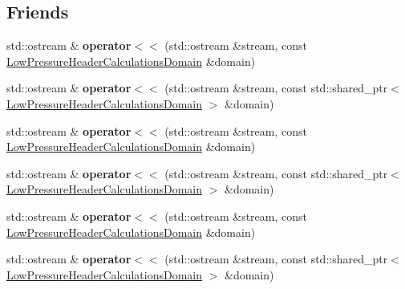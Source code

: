 \subsection*{Friends}
\begin{DoxyCompactItemize}
\item 
\mbox{\label{class_low_pressure_header_calculations_domain_a591fa325c475690e838e1e50762635d5}} 
std\+::ostream \& {\bfseries operator$<$$<$} (std\+::ostream \&stream, const \hyperlink{class_low_pressure_header_calculations_domain}{Low\+Pressure\+Header\+Calculations\+Domain} \&domain)
\item 
\mbox{\label{class_low_pressure_header_calculations_domain_a3bad233c04c027aef6be3a3e3cdc4158}} 
std\+::ostream \& {\bfseries operator$<$$<$} (std\+::ostream \&stream, const std\+::shared\+\_\+ptr$<$ \hyperlink{class_low_pressure_header_calculations_domain}{Low\+Pressure\+Header\+Calculations\+Domain} $>$ \&domain)
\item 
\mbox{\label{class_low_pressure_header_calculations_domain_a591fa325c475690e838e1e50762635d5}} 
std\+::ostream \& {\bfseries operator$<$$<$} (std\+::ostream \&stream, const \hyperlink{class_low_pressure_header_calculations_domain}{Low\+Pressure\+Header\+Calculations\+Domain} \&domain)
\item 
\mbox{\label{class_low_pressure_header_calculations_domain_a3bad233c04c027aef6be3a3e3cdc4158}} 
std\+::ostream \& {\bfseries operator$<$$<$} (std\+::ostream \&stream, const std\+::shared\+\_\+ptr$<$ \hyperlink{class_low_pressure_header_calculations_domain}{Low\+Pressure\+Header\+Calculations\+Domain} $>$ \&domain)
\item 
\mbox{\label{class_low_pressure_header_calculations_domain_a591fa325c475690e838e1e50762635d5}} 
std\+::ostream \& {\bfseries operator$<$$<$} (std\+::ostream \&stream, const \hyperlink{class_low_pressure_header_calculations_domain}{Low\+Pressure\+Header\+Calculations\+Domain} \&domain)
\item 
\mbox{\label{class_low_pressure_header_calculations_domain_a3bad233c04c027aef6be3a3e3cdc4158}} 
std\+::ostream \& {\bfseries operator$<$$<$} (std\+::ostream \&stream, const std\+::shared\+\_\+ptr$<$ \hyperlink{class_low_pressure_header_calculations_domain}{Low\+Pressure\+Header\+Calculations\+Domain} $>$ \&domain)
\end{DoxyCompactItemize}


